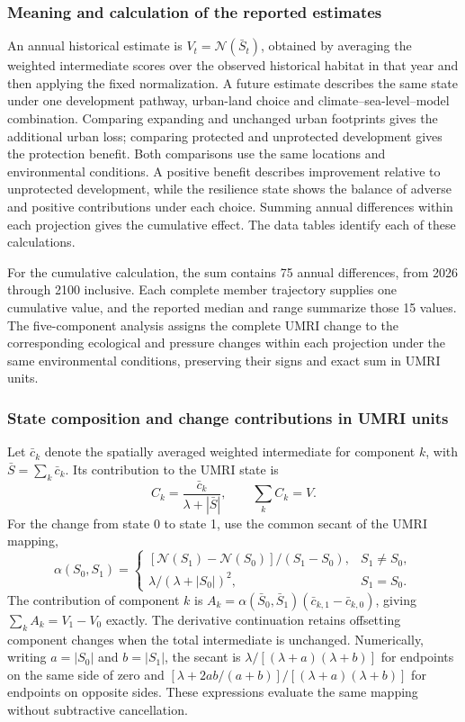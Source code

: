 \subsubsection{Meaning and calculation of the reported estimates}
An annual historical estimate is $V_t=\mathcal{N}(\bar S_t)$, obtained by averaging the weighted intermediate scores over the observed historical habitat in that year and then applying the fixed normalization. A future estimate describes the same state under one development pathway, urban-land choice and climate--sea-level--model combination. Comparing expanding and unchanged urban footprints gives the additional urban loss; comparing protected and unprotected development gives the protection benefit. Both comparisons use the same locations and environmental conditions. A positive benefit describes improvement relative to unprotected development, while the resilience state shows the balance of adverse and positive contributions under each choice. Summing annual differences within each projection gives the cumulative effect. The data tables identify each of these calculations.

For the cumulative calculation, the sum contains 75 annual differences, from 2026 through 2100 inclusive. Each complete member trajectory supplies one cumulative value, and the reported median and range summarize those 15 values. The five-component analysis assigns the complete UMRI change to the corresponding ecological and pressure changes within each projection under the same environmental conditions, preserving their signs and exact sum in UMRI units.

\subsubsection{State composition and change contributions in UMRI units}

Let $\bar c_k$ denote the spatially averaged weighted intermediate for component $k$, with $\bar S=\sum_k\bar c_k$. Its contribution to the UMRI state is
\[
C_k=\frac{\bar c_k}{\lambda+|\bar S|},\qquad \sum_kC_k=V.
\]
For the change from state 0 to state 1, use the common secant of the UMRI mapping,
\[
\alpha(S_0,S_1)=
\begin{cases}
[\mathcal{N}(S_1)-\mathcal{N}(S_0)]/(S_1-S_0),&S_1\ne S_0,\\
\lambda/(\lambda+|S_0|)^2,&S_1=S_0.
\end{cases}
\]
The contribution of component $k$ is $A_k=\alpha(\bar S_0,\bar S_1)(\bar c_{k,1}-\bar c_{k,0})$, giving $\sum_kA_k=V_1-V_0$ exactly. The derivative continuation retains offsetting component changes when the total intermediate is unchanged. Numerically, writing $a=|S_0|$ and $b=|S_1|$, the secant is $\lambda/[(\lambda+a)(\lambda+b)]$ for endpoints on the same side of zero and $[\lambda+2ab/(a+b)]/[(\lambda+a)(\lambda+b)]$ for endpoints on opposite sides. These expressions evaluate the same mapping without subtractive cancellation.

